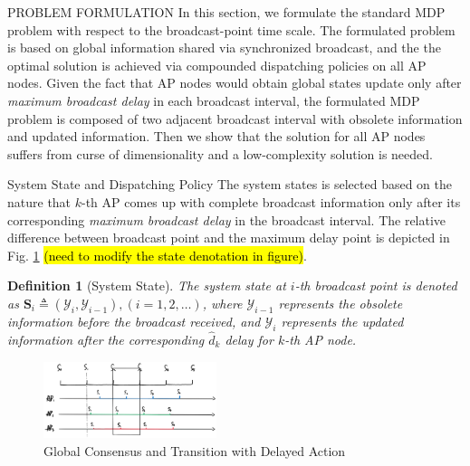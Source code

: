 \documentclass[10pt, conference, letterpaper]{IEEEtran}
\newtheorem{definition}{Definition}
\newcommand{\define}{\triangleq}
\newcommand{\Stat}{\mathbf{S}}
\newcommand{\Obsv}{\mathcal{Y}}
\begin{document}
    \begin{section}{PROBLEM FORMULATION}
        \label{sec:formulation}
        In this section, we formulate the standard MDP problem with respect to the broadcast-point time scale. The formulated problem is based on global information shared via synchronized broadcast, and the the optimal solution is achieved via compounded dispatching policies on all AP nodes.
        Given the fact that AP nodes would obtain global states update only after \emph{maximum broadcast delay} in each broadcast interval, the formulated MDP problem is composed of two adjacent broadcast interval with obsolete information and updated information.
        Then we show that the solution for all AP nodes suffers from curse of dimensionality and a low-complexity solution is needed.

        \begin{subsection}{System State and Dispatching Policy}
            The system states is selected based on the nature that $k$-th AP comes up with complete broadcast information only after its corresponding \emph{maximum broadcast delay} in the broadcast interval.
            The relative difference between broadcast point and the maximum delay point is depicted in Fig. \ref{fig:br-trans} \hl{(need to modify the state denotation in figure)}.
            \begin{definition}[System State]
                The system state at $i$-th broadcast point is denoted as $\Stat_i \define (\Obsv_{i}, \Obsv_{i-1}), (i=1,2,\dots)$, where $\Obsv_{i-1}$ represents the obsolete information before the broadcast received, and $\Obsv_{i}$ represents the updated information after the corresponding $\hat{d}_k$ delay for $k$-th AP node.
            \end{definition}

            \begin{figure}[ht]
                \centering
                \includegraphics[width=0.45\textwidth]{broadcast-trans.png}
                \caption{Global Consensus and Transition with Delayed Action}
                \label{fig:br-trans}
            \end{figure}


\end{subsection}
\end{section}
\end{document}

